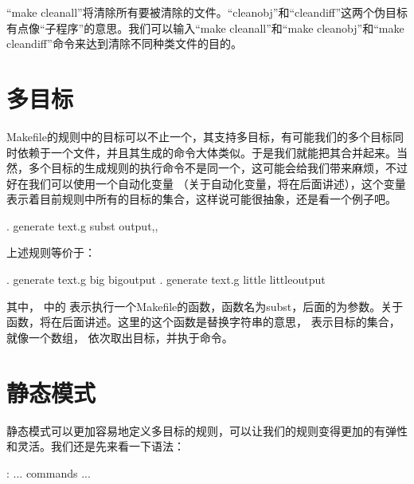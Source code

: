 \documentclass[a4paper,10pt]{sphinxmanual}
\begin{document}
“make cleanall”将清除所有要被清除的文件。“cleanobj”和“cleandiff”这两个伪目标有点像“子程序”的意思。我们可以输入“make cleanall”和“make cleanobj”和“make cleandiff”命令来达到清除不同种类文件的目的。


\section{多目标}
\label{\detokenize{rules:id7}}
Makefile的规则中的目标可以不止一个，其支持多目标，有可能我们的多个目标同时依赖于一个文件，并且其生成的命令大体类似。于是我们就能把其合并起来。当然，多个目标的生成规则的执行命令不是同一个，这可能会给我们带来麻烦，不过好在我们可以使用一个自动化变量  （关于自动化变量，将在后面讲述），这个变量表示着目前规则中所有的目标的集合，这样说可能很抽象，还是看一个例子吧。

\begin{sphinxVerbatim}[commandchars=\\\{\}]
 .
    generate text.g \PYGZhy{}subst output,, \PYGZgt{} 
\end{sphinxVerbatim}

上述规则等价于：

\begin{sphinxVerbatim}[commandchars=\\\{\}]
 .
    generate text.g \PYGZhy{}big \PYGZgt{} bigoutput
 .
    generate text.g \PYGZhy{}little \PYGZgt{} littleoutput
\end{sphinxVerbatim}

其中，  中的 \sphinxcode{\sphinxupquote{\$}} 表示执行一个Makefile的函数，函数名为subst，后面的为参数。关于函数，将在后面讲述。这里的这个函数是替换字符串的意思，  表示目标的集合，就像一个数组，  依次取出目标，并执于命令。


\section{静态模式}
\label{\detokenize{rules:id8}}
静态模式可以更加容易地定义多目标的规则，可以让我们的规则变得更加的有弹性和灵活。我们还是先来看一下语法：

\begin{sphinxVerbatim}[commandchars=\\\{\}]
 \PYGZlt{}\PYGZhy{}\PYGZgt{} : \PYGZlt{}\PYGZhy{} ...\PYGZgt{}
    \PYGZlt{}commands\PYGZgt{}
    ...
\end{sphinxVerbatim}
\end{document}
